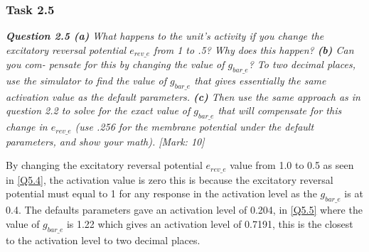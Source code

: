 \subsubsection{Task 2.5}
\label{Q1:Expl 2.6.1(2.5) SubSubSection}

\begin{tcolorbox}[colback=gray!20!white,colframe=gray!20!white]
  \emph{\textbf{Question 2.5 (a)} What happens to the unit’s activity if you change the excitatory reversal potential $e_{rev\_e}$ from 1 to .5? Why does this happen? \textbf{(b)} Can you com- pensate for this by changing the value of $g_{bar\_e}$? To two decimal places, use the simulator to find the value of $g_{bar\_e}$ that gives essentially the same activation value as the default parameters. \textbf{(c)} Then use the same approach as in question 2.2 to solve for the exact value of $g_{bar\_e}$ that will compensate for this change in $e_{rev\_e}$ (use .256 for the membrane potential under the default parameters, and show your math). [Mark: 10]}
\end{tcolorbox} 
\vspace{0.5cm}

By changing the excitatory reversal potential $e_{rev\_e}$ value from 1.0 to 0.5 as seen in \cref{Q5.4}, the activation value is zero this is because the excitatory reversal potential must equal to 1 for any response in the activation level as the $g_{bar\_e}$ is at 0.4. The defaults parameters gave an activation level of 0.204, in \cref{Q5.5} where the value of $g_{bar\_e}$ is 1.22 which gives an activation level of 0.7191, this is the closest to the activation level to two decimal places. \\

